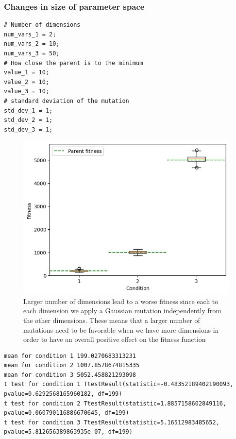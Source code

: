 \subsubsection{Changes in size of parameter space}
\begin{lstlisting}
# Number of dimensions
num_vars_1 = 2;
num_vars_2 = 10;
num_vars_3 = 50;
# How close the parent is to the minimum
value_1 = 10;
value_2 = 10;
value_3 = 10;
# standard deviation of the mutation
std_dev_1 = 1;
std_dev_2 = 1;
std_dev_3 = 1;
\end{lstlisting}
\begin{figure}[H]
    \centering
    \includegraphics[width=\linewidth]{images/lab1/diff_dimensions.png}
    \caption{Larger number of dimensions lead to a worse fitness since each to each dimension we apply a Gaussian mutation independently from the other dimensions. These means that a larger number of mutations need to be favorable when we have more dimensions in order to have an overall positive effect on the fitness function}
    \label{fig:my_label}
\end{figure}
\begin{lstlisting}
mean for condition 1 199.0270683313231
mean for condition 2 1007.8578674815335
mean for condition 3 5052.458821293098
t test for condition 1 TtestResult(statistic=-0.48352189402190093, pvalue=0.6292568165960182, df=199)
t test for condition 2 TtestResult(statistic=1.8857158602849116, pvalue=0.060790116886670645, df=199)
t test for condition 3 TtestResult(statistic=5.16512983485652, pvalue=5.812656389863935e-07, df=199)   
\end{lstlisting}



